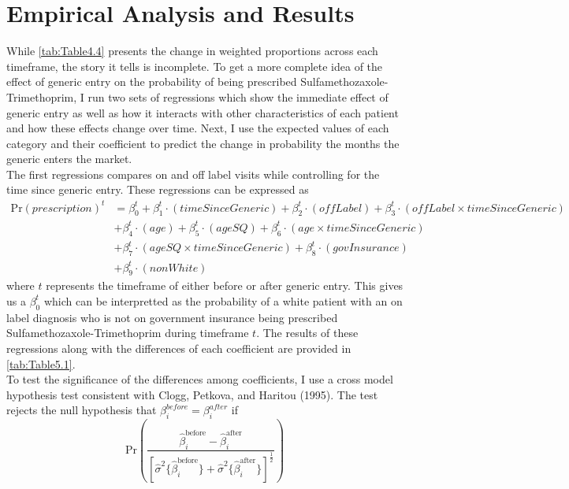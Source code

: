 \chapter{Empirical Analysis and Results}
While \autoref{tab:Table4.4} presents the change in weighted proportions across each timeframe, the story it tells is incomplete. To get a more complete idea of the effect of generic entry on the probability of being prescribed Sulfamethozaxole-Trimethoprim, I run two sets of regressions which show the immediate effect of generic entry as well as how it interacts with other characteristics of each patient and how these effects change over time. Next, I use the expected values of each category and their coefficient to predict the change in probability the months the generic enters the market. \\
\indent The first regressions compares on and off label visits while controlling for the time since generic entry. These regressions can be expressed as
\begin{equation}
\begin{split}
    \text{Pr}(prescription)^t & = \beta^t_0 + \beta^t_1\cdot(timeSinceGeneric) + \beta_2^t\cdot(offLabel) + \beta_3^t\cdot(offLabel\times timeSinceGeneric)\\
    & + \beta_4^t\cdot(age) + \beta_5^t\cdot(ageSQ)  + \beta_6^t\cdot(age\times timeSinceGeneric)\\
    & + \beta_7^t\cdot(ageSQ\times timeSinceGeneric)  + \beta_8^t\cdot(govInsurance)\\
    & + \beta_9^t\cdot(nonWhite)
\end{split}
\end{equation}
where $t$ represents the timeframe of either before or after generic entry. This gives us a $\beta_0^t$ which can be interpretted as the probability of a white patient with an on label diagnosis who is not on government insurance being prescribed Sulfamethozaxole-Trimethoprim during timeframe $t$. The results of these regressions along with the differences of each coefficient are provided in \autoref{tab:Table5.1}.\\
\indent To test the significance of the differences among coefficients, I use a cross model hypothesis test consistent with Clogg, Petkova, and Haritou (1995)\cite{clogg_statistical_1995}. The test rejects the null hypothesis that $\beta_i^{before} = \beta_i^{after}$ if 
\begin{equation}
\text{Pr}(\frac{\hat{\beta}^\text{before}_i - \hat{\beta}^\text{after}_i}{[\hat{\sigma}^2\{\hat{\beta}^\text{before}_i\} + \hat{\sigma}^2\{\hat{\beta}^\text{after}_i\}]^\frac{1}{2}})
\end{equation}
